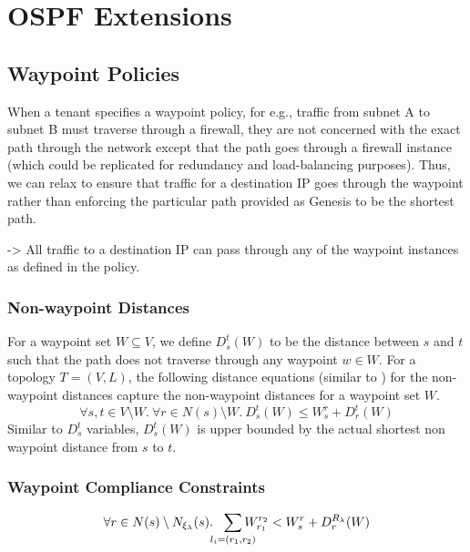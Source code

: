 \section{OSPF Extensions}
\subsection{Waypoint Policies}
When a tenant specifies a waypoint policy, for e.g., traffic from
subnet A to subnet B must traverse through a firewall, they are not
concerned with the exact path through the network except that the 
path goes through a firewall instance (which could be replicated for
redundancy and load-balancing purposes). 
Thus, we can relax 
to ensure that traffic for a destination IP goes 
through the waypoint rather than 
enforcing the particular path provided as Genesis 
to be the shortest path. 

-> All traffic to a destination IP can pass through any of the
waypoint instances as defined in the policy.

\subsubsection{Non-waypoint Distances}
For a waypoint set $W \subseteq V$, we define $D_s^t(W)$ to be the 
distance between $s$ and $t$ such that the path does not
 traverse through any waypoint $w \in W$. For a topology 
 $T = (V,L)$, the following distance equations (similar to 
 ) for the non-waypoint distances capture the
 non-waypoint distances for a waypoint set $W$.
\begin{equation} \label{eq:dist}
\forall s, t \in V \setminus W. ~\forall r \in N(s) \setminus W.~
D_s^t(W) \leq W_s^r + D_r^t(W)
\end{equation}
Similar to $D_s^t$ variables, $D_s^t(W)$ is upper bounded by the
actual shortest non waypoint distance from $s$ to $t$.

\subsubsection{Waypoint Compliance Constraints}

\begin{equation} \label{eq:waypoint}
\forall r \in N(s) \setminus N_{\xi_\lambda}(s).~~ \sum_{\mathclap{\substack{l_i=(r_1,r_2)}}} 
W_{r_1}^{r_2} < 
W_{s}^{r}+ D_{r}^{R_\lambda}(W) 
\end{equation}